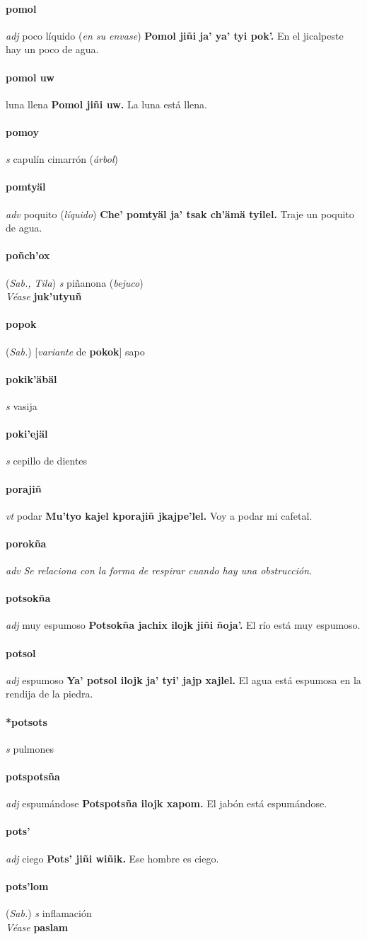 \documentclass{scrbook}
\newcommand{\entry}[1]{\paragraph{#1}}
\newcommand{\nontranslationdef}[1]{\textit{#1}}
\newcommand{\partofspeech}[1]{\textit{#1}}
\newcommand{\spanishtranslation}[1]{#1}
\newcommand{\clarification}[1]{(\textit{#1})}
\newcommand{\cholexample}[1]{\textbf{#1}}
\newcommand{\exampletranslation}[1]{#1}
\newcommand{\alsosee}[1]{\\\textit{Véase} \textbf{#1}}
\newcommand{\relevantdialect}[1]{(\textit{#1})}
\newcommand{\conjugationtense}[1]{[\textit{#1}}
\newcommand{\conjugationverb}[1]{de \textbf{#1}]}
\begin{document}
\begin{multicols}{2}
\entry{pomol}
\partofspeech{adj}
\spanishtranslation{poco líquido}
\clarification{en su envase}
\cholexample{Pomol jiñi ja' ya' tyi pok'.}
\exampletranslation{En el jicalpeste hay un poco de agua.}

\entry{pomol uw}
\spanishtranslation{luna llena}
\cholexample{Pomol jiñi uw.}
\exampletranslation{La luna está llena.}

\entry{pomoy}
\partofspeech{s}
\spanishtranslation{capulín cimarrón}
\clarification{árbol}

\entry{pomtyäl}
\partofspeech{adv}
\spanishtranslation{poquito}
\clarification{líquido}
\cholexample{Che' pomtyäl ja' tsak ch'ämä tyilel.}
\exampletranslation{Traje un poquito de agua.}

\entry{poñch'ox}
\relevantdialect{Sab., Tila}
\partofspeech{s}
\spanishtranslation{piñanona}
\clarification{bejuco}
\alsosee{juk'utyuñ}

\entry{popok}
\relevantdialect{Sab.}
\conjugationtense{variante}
\conjugationverb{pokok}
\spanishtranslation{sapo}

\entry{pokik'äbäl}
\partofspeech{s}
\spanishtranslation{vasija}

\entry{poki'ejäl}
\partofspeech{s}
\spanishtranslation{cepillo de dientes}

\entry{porajiñ}
\partofspeech{vt}
\spanishtranslation{podar}
\cholexample{Mu'tyo kajel kporajiñ jkajpe'lel.}
\exampletranslation{Voy a podar mi cafetal.}

\entry{porokña}
\partofspeech{adv}
\nontranslationdef{Se relaciona con la forma de respirar cuando hay una obstrucción.}

\entry{potsokña}
\partofspeech{adj}
\spanishtranslation{muy espumoso}
\cholexample{Potsokña jachix ilojk jiñi ñoja'.}
\exampletranslation{El río está muy espumoso.}

\entry{potsol}
\partofspeech{adj}
\spanishtranslation{espumoso}
\cholexample{Ya' potsol ilojk ja' tyi' jajp xajlel.}
\exampletranslation{El agua está espumosa en la rendija de la piedra.}

\entry{*potsots}
\partofspeech{s}
\spanishtranslation{pulmones}

\entry{potspotsña}
\partofspeech{adj}
\spanishtranslation{espumándose}
\cholexample{Potspotsña ilojk xapom.}
\exampletranslation{El jabón está espumándose.}

\entry{pots'}
\partofspeech{adj}
\spanishtranslation{ciego}
\cholexample{Pots' jiñi wiñik.}
\exampletranslation{Ese hombre es ciego.}

\entry{pots'lom}
\relevantdialect{Sab.}
\partofspeech{s}
\spanishtranslation{inflamación}
\alsosee{paslam}


\end{multicols}
\end{document}
